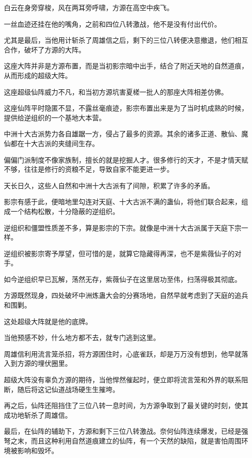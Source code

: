
\begin{this_body}

白云在身旁穿梭，风在两耳旁呼啸，方源在高空中疾飞。

一丝血迹还挂在他的嘴角，之前和四位八转激战，他不是没有付出代价。

尤其是最后，当他用计斩杀了周雄信之后，剩下的三位八转便决意撤退，他们相互合作，破坏了方源的大阵。

这座大阵并非是方源布置，而是当初影宗暗中出手，结合了附近天地的自然道痕，从而形成的超级大阵。

这座超级仙阵威力不凡，和当初方源坑害夏槎一批人的那座大阵相差仿佛。

这座仙阵平时隐匿不显，不露丝毫痕迹，影宗布置出来是为了当时机成熟的时候，提供给逆组织的一个基地大本营。

中洲十大古派势力各自雄踞一方，侵占了最多的资源。其余的诸多正道、散仙、魔仙都在十大古派的夹缝间生存。

偏偏门派制度不像家族制，擅长的就是挖掘人才。很多修行的天才，不是才情天赋不够，往往是修行的资粮不足，导致自家不能更进一步。

天长日久，这些人自然和中洲十大古派有了间隙，积累了许多的矛盾。

影宗有感于此，便暗地里勾连对天庭、十大古派不满的蛊仙，将他们联合起来，组成一个结构松散，十分隐蔽的逆组织。

逆组织和僵盟性质差不多，算是影宗的下宗。就像是中洲十大古派属于天庭下宗一样。

逆组织被影宗寄予厚望，但可惜的是，就算它隐藏得再深，也不是紫薇仙子的对手。

如今逆组织早已瓦解，荡然无存，紫薇仙子在这里居功至伟，扫荡得极其彻底。

方源既然现身，四处破坏中洲炼蛊大会的分赛场地，自然早就考虑到了天庭的追兵和围剿。

这处超级大阵就是他的底牌。

当他预感不妙，什么地方都不去，就专门逃到这里。

周雄信利用流言笼杀招，将方源困住时，心底雀跃，却是万万没有想到，他早就落入到方源的埋伏圈里。

超级大阵没有辜负方源的期待，当他悍然催起时，便立即将流言笼和外界的联系阻断，随后将这记仙道战场硬生生摧垮。

再之后，仙阵还阻挡住了三位八转一息时间，为方源争取到了最关键的时刻，使其成功地斩杀了周雄信。

最后，在仙阵的辅助下，方源和剩下三位八转激战。奈何仙阵连续爆发，已经是强弩之末，而且这种利用自然道痕建立的仙阵，有一个天然的缺陷，就是害怕周围环境被影响和毁坏。


\end{this_body}
